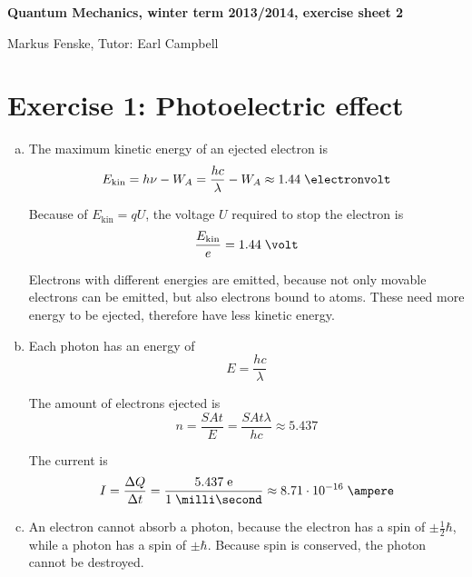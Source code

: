 \documentclass[a4paper,german,12pt,smallheadings]{scrartcl}
\begin{document}
\begin{center}
\bfseries %
\sffamily %
\vspace{-40pt}
Quantum Mechanics, winter term 2013/2014, exercise sheet 2

Markus Fenske, Tutor: Earl Campbell
\vspace{-10pt}
\end{center}

\section*{Exercise 1: Photoelectric effect}

\begin{enumerate}[a)]
  \item
    The maximum kinetic energy of an ejected electron is
    \begin{equation*}
      E_\text{kin} = h \nu - W_A = \frac{hc}{\lambda} - W_A \approx 1.44 \; \electronvolt
    \end{equation*}

    Because of $E_\text{kin} = q U$, the voltage $U$ required to stop the electron is
    \begin{equation*}
      \frac{E_\text{kin}}{e} = 1.44 \; \volt
    \end{equation*}

    Electrons with different energies are emitted, because not only movable
    electrons can be emitted, but also electrons bound to atoms. These need
    more energy to be ejected, therefore have less kinetic energy.

  \item
    Each photon has an energy of
    \begin{equation*}
      E = \frac{hc}{\lambda}
    \end{equation*}

    The amount of electrons ejected is
    \begin{equation*}
      n = \frac{S A t}{E} = \frac{S A t \lambda}{hc} \approx 5.437
    \end{equation*}

    The current is
    \begin{equation*}
      I = \frac{\Delta Q}{\Delta t} = \frac{5.437 \; \text{e}}{1 \; \milli\second} \approx 8.71 \cdot 10^{-16} \; \ampere
    \end{equation*}

  \item
    An electron cannot absorb a photon, because the electron has a spin of $\pm
    \frac{1}{2} \hbar$, while a photon has a spin of $\pm \hbar$. Because spin
    is conserved, the photon cannot be destroyed.


\end{enumerate}
\end{document}
